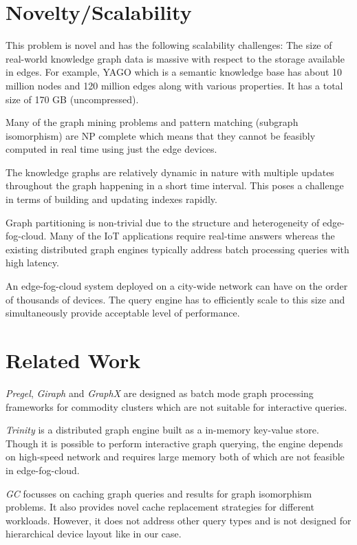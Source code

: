 \documentclass[conference]{IEEEtran}
\begin{document}
\section{Novelty/Scalability}
This problem is novel and has the following scalability challenges: The size of real-world knowledge graph data is massive with respect to the storage available in edges. For example, YAGO which is a semantic knowledge base has about 10 million nodes and 120 million edges along with various properties. It has a total size of 170 GB (uncompressed).

Many of the graph mining problems and pattern matching (subgraph isomorphism) are NP complete which means that they cannot be feasibly computed in real time using just the edge devices. 

The knowledge graphs are relatively dynamic in nature with multiple updates throughout the graph happening in a short time interval. This poses a challenge in terms of building and updating indexes rapidly.

Graph partitioning is non-trivial due to the structure and heterogeneity of edge-fog-cloud. Many of the IoT applications require real-time answers whereas the existing distributed graph engines typically address batch processing queries with high latency.

An edge-fog-cloud system deployed on a city-wide network can have on the order of thousands of devices.  The query engine has to efficiently scale to this size and simultaneously provide acceptable level of performance.

\section{Related Work}

\emph{Pregel}, \emph{Giraph} and \emph{GraphX} are designed as batch mode graph processing frameworks for commodity clusters which are not suitable for interactive queries.

\emph{Trinity} is a distributed graph engine built as a in-memory key-value store. Though it is possible to perform interactive graph querying, the engine depends on high-speed network and requires large memory both of which are not feasible in edge-fog-cloud.

\emph{GC} focusses on caching graph queries and results for graph isomorphism problems. It also provides novel cache replacement strategies for different workloads. However, it does not address other query types and is not designed for hierarchical device layout like in our case.
\end{document}
